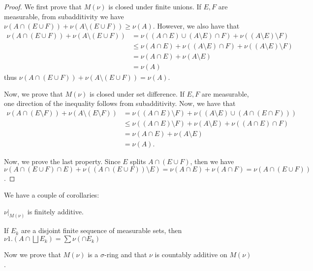 \begin{proof}
    We first prove that $M(\nu)$ is closed under finite unions. If $E, F$ are measurable, from subadditivity we have $\nu(A \cap (E \cup F)) + \nu(A \setminus (E \cup F)) \ge \nu(A)$. However, we also have that \begin{align*}
        \nu(A \cap (E \cup F)) + \nu(A \setminus (E \cup F)) &= \nu((A \cap E) \cup (A \setminus E) \cap F) + \nu((A \setminus E) \setminus F) \\
        &\le \nu(A \cap E) + \nu((A \setminus E) \cap F) + \nu((A \setminus E) \setminus F)\\
        &= \nu(A \cap E) + \nu(A \setminus E) \tag{because $F$ splits $A \setminus E$}\\
        &= \nu(A)
    \end{align*}
    thus $\nu(A \cap (E \cup F)) + \nu(A \setminus (E \cup F)) = \nu(A)$.

    Now, we prove that $M(\nu)$ is closed under set difference. If $E, F$ are measurable, one direction of the inequality follows from subadditivity. Now, we have that 
    \begin{align*}
        \nu(A \cap (E \setminus F)) + \nu(A \setminus (E \setminus F)) &= \nu((A \cap E) \setminus F) + \nu((A \setminus E) \cup (A \cap (E \cap F)))\\
        &\le \nu((A \cap E) \setminus F) + \nu(A \setminus E) + \nu((A \cap E) \cap F)\\
        &= \nu(A \cap E) + \nu(A \setminus E)\\
        &= \nu(A).
    \end{align*}

    Now, we prove the last property. Since $E$ splits $A \cap (E \cup F)$, then we have $\nu(A \cap (E \cup F) \cap E) + \nu((A \cap (E \cup F)) \setminus E) = \nu(A \cap E) + \nu(A \cap F) = \nu(A \cap (E \cup F))$.
\end{proof}

We have a couple of corollaries:

\begin{corollary}
    $\nu\vert_{M(\nu)}$ is finitely additive.
\end{corollary}

\begin{corollary}
    If $E_k$ are a disjoint finite sequence of measurable sets, then $\nu1.(A \cap \bigsqcup E_k) = \sum \nu(\cap E_k)$
\end{corollary}

Now we prove that $M(\nu)$ is a $\sigma$-ring and that $\nu$ is countably additive on $M(\nu)$.

